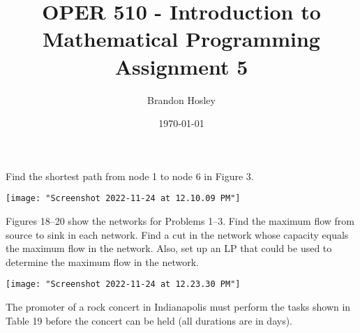 \documentclass[answers]{exam}
\title{OPER 510 - Introduction to Mathematical Programming%
	\\ Assignment 5}
\author{Brandon Hosley}
\date{\today}
\begin{document}
\maketitle
\unframedsolutions

\begin{questions}
\question
Find the shortest path from node 1 to node 6 in Figure 3.

\texttt{[image: "Screenshot 2022-11-24 at 12.10.09 PM"]}

\begin{solution}

\end{solution}


\question
Figures 18–20 show the networks for Problems 1–3. Find the maximum flow from source to sink in each network. Find a cut in the network whose capacity equals the
maximum flow in the network. Also, set up an LP that could be used to determine the maximum flow in the network.

\texttt{[image: "Screenshot 2022-11-24 at 12.23.30 PM"]}



\begin{solution}

\end{solution}


\question
The promoter of a rock concert in Indianapolis must perform the tasks shown in Table 19 before the concert can be held (all durations are in days).


\end{questions}
\end{document}
